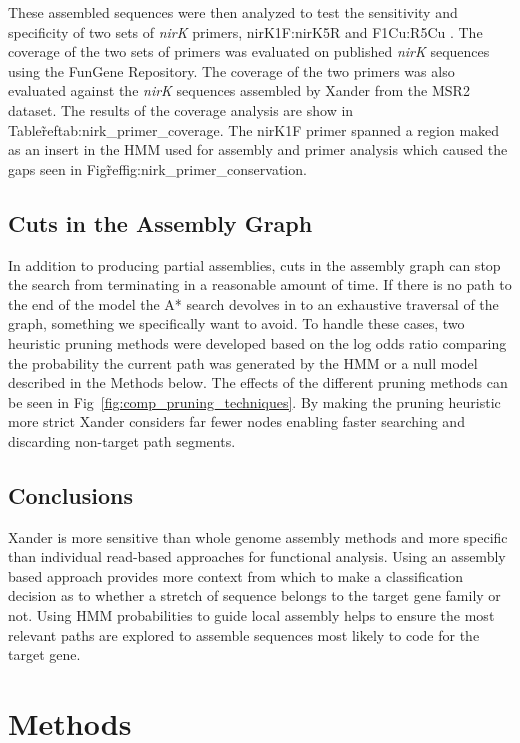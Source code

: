\documentclass[10pt]{bmc_article}
\newenvironment{bmcformat}{\begin{raggedright}\baselineskip20pt\sloppy\setboolean{publ}{false}}{\end{raggedright}\baselineskip20pt\sloppy}
\begin{document}
\begin{bmcformat}
These assembled sequences were then analyzed to test the sensitivity and specificity of two sets of \emph{nirK} primers, nirK1F:nirK5R \cite{braker_development_1998} and F1Cu:R5Cu \cite{hallin_pcr_1999}.  The coverage of the two sets of primers was evaluated on published \emph{nirK} sequences using the FunGene Repository.  The coverage of the two primers was also evaluated against the \emph{nirK} sequences assembled by Xander from the MSR2 dataset.  The results of the coverage analysis are show in Table\~ref{tab:nirk_primer_coverage}.  The nirK1F primer spanned a region maked as an insert in the HMM used for assembly and primer analysis which caused the gaps seen in Fig\~ref{fig:nirk_primer_conservation}.

\subsection*{Cuts in the Assembly Graph}

In addition to producing partial assemblies, cuts in the assembly graph can stop the search from terminating in a reasonable amount of time. If there is no path to the end of the model the A* search devolves in to an exhaustive traversal of the graph, something we specifically want to avoid.  To handle these cases, two heuristic pruning methods were developed based on the log odds ratio comparing the probability the current path was generated by the HMM or a null model described in the Methods below.  The effects of the different pruning methods can be seen in Fig~\ref{fig:comp_pruning_techniques}.  By making the pruning heuristic more strict Xander considers far fewer nodes enabling faster searching and discarding non-target path segments.

\subsection*{Conclusions}
Xander is more sensitive than whole genome assembly methods and more specific than individual read-based approaches for functional analysis.  Using an assembly based approach provides more context from which to make a classification decision as to whether a stretch of sequence belongs to the target gene family or not.  Using HMM probabilities to guide local assembly helps to ensure the most relevant paths are explored to assemble sequences most likely to code for the target gene.
  
\section*{Methods}

\end{bmcformat}
\end{document}
